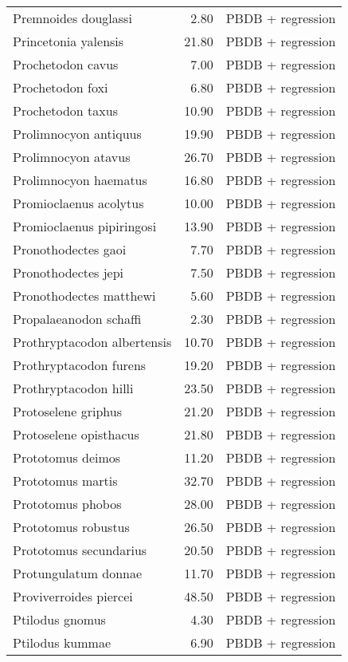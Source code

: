\begin{table}[ht]
\begin{tabular}{lrl}
  Premnoides douglassi & 2.80 & PBDB + regression \\ 
  Princetonia yalensis & 21.80 & PBDB + regression \\ 
  Prochetodon cavus & 7.00 & PBDB + regression \\ 
  Prochetodon foxi & 6.80 & PBDB + regression \\ 
  Prochetodon taxus & 10.90 & PBDB + regression \\ 
  Prolimnocyon antiquus & 19.90 & PBDB + regression \\ 
  Prolimnocyon atavus & 26.70 & PBDB + regression \\ 
  Prolimnocyon haematus & 16.80 & PBDB + regression \\ 
  Promioclaenus acolytus & 10.00 & PBDB + regression \\ 
  Promioclaenus pipiringosi & 13.90 & PBDB + regression \\ 
  Pronothodectes gaoi & 7.70 & PBDB + regression \\ 
  Pronothodectes jepi & 7.50 & PBDB + regression \\ 
  Pronothodectes matthewi & 5.60 & PBDB + regression \\ 
  Propalaeanodon schaffi & 2.30 & PBDB + regression \\ 
  Prothryptacodon albertensis & 10.70 & PBDB + regression \\ 
  Prothryptacodon furens & 19.20 & PBDB + regression \\ 
  Prothryptacodon hilli & 23.50 & PBDB + regression \\ 
  Protoselene griphus & 21.20 & PBDB + regression \\ 
  Protoselene opisthacus & 21.80 & PBDB + regression \\ 
  Prototomus deimos & 11.20 & PBDB + regression \\ 
  Prototomus martis & 32.70 & PBDB + regression \\ 
  Prototomus phobos & 28.00 & PBDB + regression \\ 
  Prototomus robustus & 26.50 & PBDB + regression \\ 
  Prototomus secundarius & 20.50 & PBDB + regression \\ 
  Protungulatum donnae & 11.70 & PBDB + regression \\ 
  Proviverroides piercei & 48.50 & PBDB + regression \\ 
  Ptilodus gnomus & 4.30 & PBDB + regression \\ 
  Ptilodus kummae & 6.90 & PBDB + regression \\ 

\end{tabular}
\end{table}
